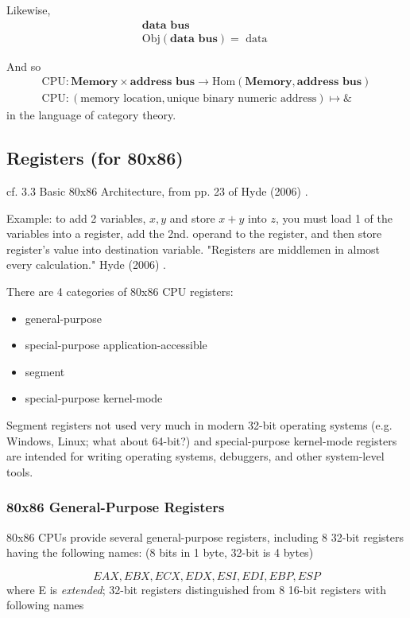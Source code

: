 \documentclass[10pt]{amsart}
\begin{document}
Likewise, 
\[
\begin{gathered}
\textbf{data bus} \\
\text{Obj}{(\textbf{data bus})} = \text{ data } 
\end{gathered}
\]

And so
\[
\begin{gathered}
\text{CPU} : \textbf{Memory} \times \textbf{address bus} \to \text{Hom}{(\textbf{Memory} , \textbf{address bus}) } \\ 
\text{CPU}: (\text{memory location} , \text{unique binary numeric address}) \mapsto \&
\end{gathered}
\]
in the language of category theory.  

\subsection{Registers (for 80x86)}  

cf. 3.3 Basic 80x86 Architecture, from pp. 23 of Hyde (2006) \cite{Hyde2006}.  

Example: to add 2 variables, $x,y$ and store $x+y$ into $z$, you must load 1 of the variables into a register, add the 2nd. operand to the register, and then store register's value into destination variable.  "Registers are middlemen in almost every calculation." Hyde (2006) \cite{Hyde2006}.  


There are 4 categories of 80x86 CPU registers: 
\begin{itemize}
	\item general-purpose
	\item special-purpose application-accessible
	\item segment
	\item special-purpose kernel-mode
\end{itemize}
Segment registers not used very much in modern 32-bit operating systems (e.g. Windows, Linux; what about 64-bit?) and special-purpose kernel-mode registers are intended for writing operating systems, debuggers, and other system-level tools.  

\subsubsection{80x86 General-Purpose Registers}  

80x86 CPUs provide several general-purpose registers, including 8 32-bit registers having the following names: (8 bits in 1 byte, 32-bit is 4 bytes)

\[
EAX, EBX, ECX, EDX, ESI, EDI, EBP, ESP
\]
where E is \emph{extended}; 32-bit registers distinguished from 8 16-bit registers with following names 
\end{document}

